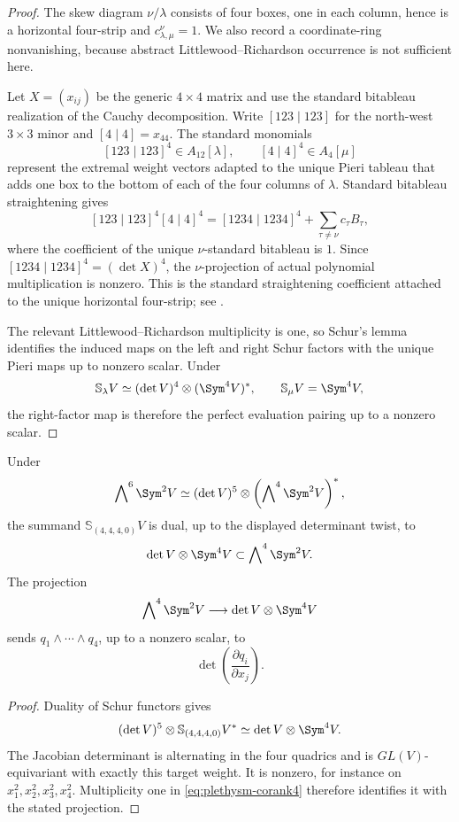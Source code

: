 \begin{proof}
The skew diagram \(\nu/\lambda\) consists of four boxes, one in
each column, hence is a horizontal four-strip and
\(c^\nu_{\lambda,\mu}=1\).  We also record a coordinate-ring
nonvanishing, because abstract Littlewood--Richardson occurrence is
not sufficient here.

Let \(X=(x_{ij})\) be the generic \(4\times4\) matrix and use the
standard bitableau realization of the Cauchy decomposition.  Write
\([123\mid123]\) for the north-west \(3\times3\) minor and
\([4\mid4]=x_{44}\).  The standard monomials
\[
 [123\mid123]^4\in A_{12}[\lambda],
 \qquad
 [4\mid4]^4\in A_4[\mu]
\]
represent the extremal weight vectors adapted to the unique Pieri
tableau that adds one box to the bottom of each of the four columns
of \(\lambda\).  Standard bitableau straightening gives
\[
 [123\mid123]^4[4\mid4]^4
 =
 [1234\mid1234]^4+\sum_{\tau\ne\nu} c_\tau B_\tau,
\]
where the coefficient of the unique \(\nu\)-standard bitableau is
\(1\).  Since \([1234\mid1234]^4=(\det X)^4\), the
\(\nu\)-projection of actual polynomial multiplication is nonzero.
This is the standard straightening coefficient attached to the
unique horizontal four-strip; see \cite{DCEP}.

The relevant Littlewood--Richardson multiplicity is one, so Schur's
lemma identifies the induced maps on the left and right Schur factors
with the unique Pieri maps up to nonzero scalar.  Under
\[
 \mathbb S_\lambda V\simeq
 (\det V)^4\otimes(\Sym^4V)^*,
 \qquad
 \mathbb S_\mu V=\Sym^4V,
\]
the right-factor map is therefore the perfect evaluation pairing up
to a nonzero scalar.
\end{proof}
\begin{lemma}
\label{lem:jacobian-projection}
Under
\[
 \bigwedge\nolimits^6\Sym^2V
 \simeq
 (\det V)^5\otimes
 \left(\bigwedge\nolimits^4\Sym^2V\right)^*,
\]
the summand
\(\mathbb S_{(4,4,4,0)}V\) is dual, up to the displayed determinant
twist, to
\[
 \det V\otimes\Sym^4V\subset
 \bigwedge\nolimits^4\Sym^2V.
\]
The projection
\[
 \bigwedge\nolimits^4\Sym^2V
 \longrightarrow
 \det V\otimes\Sym^4V
\]
sends \(q_1\wedge\cdots\wedge q_4\), up to a nonzero scalar, to
\[
 \det\left(\frac{\partial q_i}{\partial x_j}\right).
\]
\end{lemma}

\begin{proof}
Duality of Schur functors gives
\[
 (\det V)^5\otimes
 \mathbb S_{(4,4,4,0)}V^*
 \simeq
 \det V\otimes\Sym^4V.
\]
The Jacobian determinant is alternating in the four quadrics and is
\(GL(V)\)-equivariant with exactly this target weight.  It is nonzero,
for instance on
\(x_1^2,x_2^2,x_3^2,x_4^2\).  Multiplicity one in
\eqref{eq:plethysm-corank4} therefore identifies it with the stated
projection.
\end{proof}

